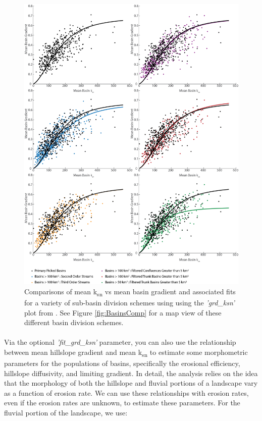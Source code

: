 \begin{figure}[H]
	\centering
	\includegraphics[width=15cm]{PNGs/grd_ksn_basinCompare.png}
	\caption{Comparisons of mean k\textsubscript{sn} vs mean basin gradient and associated fits  for a variety of sub-basin division schemes using  using the \textit{'grd\_ksn'} plot from . See Figure \ref{fig:BasinsComp} for a map view of these different basin division schemes.}
	\label{fig:GrdKsnComp}
\end{figure}


\paragraph{}Via the optional \textit{'fit\_grd\_ksn'} parameter, you can also use the relationship between mean hillslope gradient and mean k\textsubscript{sn} to estimate some morphometric parameters for the populations of basins, specifically the erosional efficiency, hillslope diffusivity, and limiting gradient. In detail, the analysis relies on the idea that the morphology of both the hillslope and fluvial portions of a landscape vary as a function of erosion rate. We can use these relationships with erosion rates, even if the erosion rates are unknown, to estimate these parameters. For the fluvial portion of the landscape, we use:

